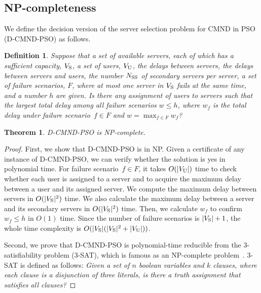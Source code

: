 \documentclass[10pt, letterpaper]{IEEEtran}
\newtheorem{thm}{Theorem} %
\newtheorem{definition}{Definition}
\begin{document}
\begin{CJK}{UTF8}{ipxm}

\section{NP-completeness}
\label{sec:NP-Completeness}

We define the decision version of the server selection problem for CMND in PSO (D-CMND-PSO) as follows.
\begin{definition}
    Suppose that a set of available servers, each of which has a sufficient capacity, $V_{\rm{S}}$, a set of users, $V_{\rm{U}}$, the delays between servers, the delays between servers and users, the number $N_{\rm{SS}}$ of secondary servers per server,
    a set of failure scenarios, $F$, where at most one server in $V_{\rm{S}}$ fails at the same time, and a number $h$ are given.
    Is there any assignment of users to servers such that the largest total delay among all failure scenarios $w \leq h$, 
    where $w_f$ is the total delay under failure scenario~$f \in F$ and $w = \max_{f \in F} w_f$?
\end{definition}
\begin{thm}
D-CMND-PSO is NP-complete.
\end{thm}
\begin{proof}
  First, we show that D-CMND-PSO is in NP.
  Given a certificate of any instance of D-CMND-PSO, we can verify whether the solution is yes in polynomial time.  %
  For failure scenario~$f \in F$, it takes $O(|V_{\rm{U}}|)$ time to check whether each user is assigned to a server and to acquire the maximum delay between a user and its assigned server.
  We compute the maximum delay between servers in $O(|V_{\rm{S}}|^2)$ time.
  We also calculate the maximum delay between a server and its secondary servers in $O(|V_{\rm{S}}|^2)$ time.
  Then, we calculate $w_f$ to confirm $w_f \leq h$ in $O(1)$ time.
  Since the number of failure scenarios is $|V_{\rm{S}}|+1$, the whole time complexity is $O(|V_{\rm{S}}|(|V_{\rm{S}}|^2+|V_{\rm{U}}|))$.

  Second, we prove that D-CMND-PSO is polynomial-time reducible from the 3-satisfiability problem (3-SAT), which is famous as an NP-complete problem~\cite{3_12_3SAT}. 
  3-SAT is defined as follows:
  {\it Given a set of $n$ boolean variables and $k$ clauses, where each clause is a disjunction of three literals, is there a truth assignment that satisfies all clauses?}


\end{proof}
\end{CJK}
\end{document}
